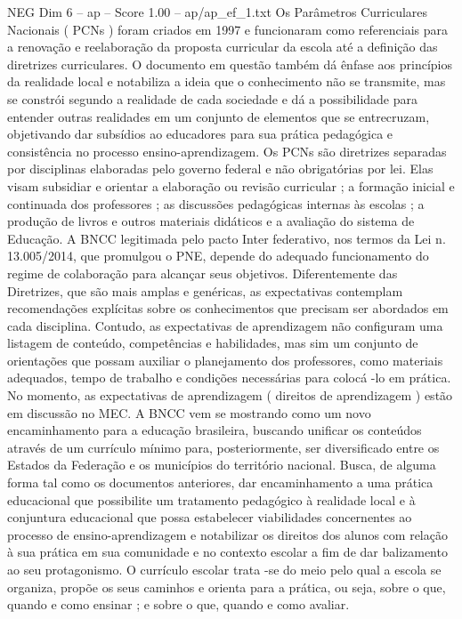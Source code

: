 \begin{textsample}{NEG Dim 6 – ap – Score 1.00 – ap/ap\_ef\_1.txt}
Os Parâmetros Curriculares Nacionais ( PCNs ) foram criados em 1997 e funcionaram como referenciais para a renovação e reelaboração da proposta curricular da escola até a definição das diretrizes curriculares.
O documento em questão também dá ênfase aos princípios da realidade local e notabiliza a ideia que o conhecimento não se transmite, mas se constrói segundo a realidade de cada sociedade e dá a possibilidade para entender outras realidades em um conjunto de elementos que se entrecruzam, objetivando dar subsídios ao educadores para sua prática pedagógica e consistência no processo ensino-aprendizagem.
Os PCNs são diretrizes separadas por disciplinas elaboradas pelo governo federal e não obrigatórias por lei.
Elas visam subsidiar e orientar a elaboração ou revisão curricular ; a formação inicial e continuada dos professores ; as discussões pedagógicas internas às escolas ; a produção de livros e outros materiais didáticos e a avaliação do sistema de Educação.
A BNCC legitimada pelo pacto Inter federativo, nos termos da Lei n. 13.005/2014, que promulgou o PNE, depende do adequado funcionamento do regime de colaboração para alcançar seus objetivos.
Diferentemente das Diretrizes, que são mais amplas e genéricas, as expectativas contemplam recomendações explícitas sobre os conhecimentos que precisam ser abordados em cada disciplina.
Contudo, as expectativas de aprendizagem não configuram uma listagem de conteúdo, competências e habilidades, mas sim um conjunto de orientações que possam auxiliar o planejamento dos professores, como materiais adequados, tempo de trabalho e condições necessárias para colocá -lo em prática.
No momento, as expectativas de aprendizagem ( direitos de aprendizagem ) estão em discussão no MEC.
A BNCC vem se mostrando como um novo encaminhamento para a educação brasileira, buscando unificar os conteúdos através de um currículo mínimo para, posteriormente, ser diversificado entre os Estados da Federação e os municípios do território nacional.
Busca, de alguma forma tal como os documentos anteriores, dar encaminhamento a uma prática educacional que possibilite um tratamento pedagógico à realidade local e à conjuntura educacional que possa estabelecer viabilidades concernentes ao processo de ensino-aprendizagem e notabilizar os direitos dos alunos com relação à sua prática em sua comunidade e no contexto escolar a fim de dar balizamento ao seu protagonismo.
O currículo escolar trata -se do meio pelo qual a escola se organiza, propõe os seus caminhos e orienta para a prática, ou seja, sobre o que, quando e como ensinar ; e sobre o que, quando e como avaliar.

\end{textsample}
